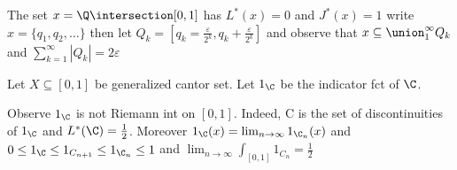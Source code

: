 \begin{example}
	The set $x = \Q \intersection [0,1]$ has  $L^*(x) = 0$ and  $J^*(x) = 1$ write  $x = \{q_1, q_2, \ldots \}$ then let $Q_k = [q_k =  \frac{\varepsilon}{2^k}, q_k + \frac{\varepsilon}{2^k}]$
	and observe that $x \subseteq \union_{1}^{\infty} Q_k$ and $\sum_{k=1}^{\infty} |Q_k| = 2 \varepsilon$
\end{example}

\begin{example}
	Let $X \subseteq [0,1]$ be generalized cantor set. Let $1_{\C}$ be the indicator fct of $\C$.

	Observe $1_ {\C}$ is not Riemann int on $[0,1]$. Indeed, C is the set of discontinuities of $1_{\C}$ and $L^*(\C) = \frac{1}{2}$. Moreover $1_{\C}(x) = \lim_{n\to \infty} 1_{\C_n} (x)$ and 
	$0 \leq 1_{\C} \leq 1_{C_{n+1}} \leq 1_{\C_{n}} \leq 1$ and 
	$\lim_{n \to \infty} \int_{[0,1]} 1_{C_{n}} = \frac{1}{2} $
\end{example}
